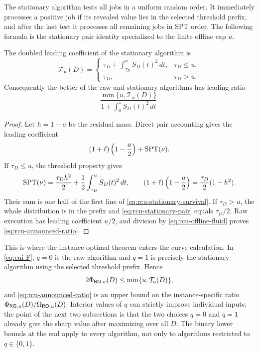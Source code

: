 The stationary algorithm tests all jobs in a uniform random order.  It
immediately processes a positive job if its revealed value lies in the
selected threshold prefix, and after the last test it processes all remaining
jobs in SPT order.  The following formula is the
stationary pair identity specialized to the finite offline cap $u$.

\begin{lemma}
\label{lem:rcu-stationary-survival}
The doubled leading coefficient of the stationary algorithm is
\begin{equation}
 \mathcal T_u(D)=
 \begin{cases}
  \displaystyle \tau_D+\int_{\tau_D}^u S_D(t)^2\,dt,&\tau_D\le u,\\[6pt]
  \tau_D,&\tau_D>u.
 \end{cases}
 \label{eq:rcu-stationary-survival}
\end{equation}
Consequently the better of the raw and stationary algorithms has leading
ratio
\begin{equation}
 \frac{\min\{u,\mathcal T_u(D)\}}
      {1+\int_0^sS_D(t)^2\,dt}.
 \label{eq:rcu-announced-ratio}
\end{equation}
\end{lemma}

\begin{proof}
Let $h=1-a$ be the residual mass.  Direct pair accounting gives the leading
coefficient
\begin{equation}
 (1+\ell)\left(1-\frac a2\right)+\operatorname{SPT}(\nu).
 \label{eq:rcu-stationary-pair}
\end{equation}
If $\tau_D\le u$, the threshold property gives
\[
 \operatorname{SPT}(\nu)=\frac{\tau_D h^2}{2}
            +\frac12\int_{\tau_D}^uS_D(t)^2\,dt,
 \qquad
 (1+\ell)\left(1-\frac a2\right)
 =\frac{\tau_D}2(1-h^2).
\]
Their sum is one half of the first line of
\eqref{eq:rcu-stationary-survival}.  If $\tau_D>u$, the whole distribution is
in the prefix and \eqref{eq:rcu-stationary-pair} equals $\tau_D/2$.  Raw
execution has leading coefficient $u/2$, and division by
\eqref{eq:rcu-offline-fluid} proves \eqref{eq:rcu-announced-ratio}.
\end{proof}

This is where the instance-optimal theorem enters the curve calculation.
In \cref{eq:cui-F}, $q=0$ is the raw algorithm and $q=1$ is precisely the
stationary algorithm using the selected threshold prefix.  Hence
\begin{equation}
 2\Phi_{\mathsf{RO},u}(D)\le\min\{u,\mathcal T_u(D)\},
 \label{eq:rcu-Phi-endpoint-upper}
\end{equation}
and \cref{eq:rcu-announced-ratio} is an upper bound on the
instance-specific ratio $\Phi_{\mathsf{RO},u}(D)/\Omega_{\mathsf{RO},u}(D)$.  Interior values of $q$ can
strictly improve individual inputs; the point of the next two subsections is
that the two choices $q=0$ and $q=1$ already give the sharp value after maximizing
over all $D$.  The binary lower bounds at the end apply to every algorithm,
not only to algorithms restricted to $q\in\{0,1\}$.

